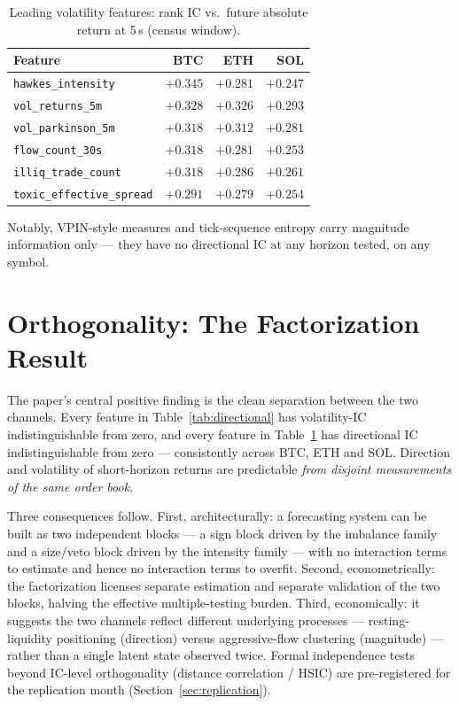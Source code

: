\documentclass[11pt,a4paper]{article}
\theoremstyle{definition}
\theoremstyle{plain}
\newcommand{\toprule}{\hline\hline}
\newcommand{\midrule}{\hline}
\newcommand{\bottomrule}{\hline\hline}
\newcommand{\feat}[1]{\texttt{#1}}
\begin{document}
\begin{table}[htbp]
\centering
\small
\caption{Leading volatility features: rank IC vs.\ future absolute
return at 5\,s (census window).}
\label{tab:volatility}
\begin{tabular}{lrrr}
\toprule
Feature & BTC & ETH & SOL \\
\midrule
\feat{hawkes\_intensity}       & $+0.345$ & $+0.281$ & $+0.247$ \\
\feat{vol\_returns\_5m}        & $+0.328$ & $+0.326$ & $+0.293$ \\
\feat{vol\_parkinson\_5m}      & $+0.318$ & $+0.312$ & $+0.281$ \\
\feat{flow\_count\_30s}        & $+0.318$ & $+0.281$ & $+0.253$ \\
\feat{illiq\_trade\_count}     & $+0.318$ & $+0.286$ & $+0.261$ \\
\feat{toxic\_effective\_spread}& $+0.291$ & $+0.279$ & $+0.254$ \\
\bottomrule
\end{tabular}
\end{table}

Notably, VPIN-style measures and tick-sequence entropy carry
magnitude information only --- they have no directional IC at any
horizon tested, on any symbol.

\section{Orthogonality: The Factorization Result}
\label{sec:orthogonality}

The paper's central positive finding is the clean separation between
the two channels. Every feature in Table~\ref{tab:directional} has
volatility-IC indistinguishable from zero, and every feature in
Table~\ref{tab:volatility} has directional IC indistinguishable from
zero --- consistently across BTC, ETH and SOL. Direction and
volatility of short-horizon returns are predictable \emph{from
disjoint measurements of the same order book}.

Three consequences follow. First, architecturally: a forecasting
system can be built as two independent blocks --- a sign block driven
by the imbalance family and a size/veto block driven by the intensity
family --- with no interaction terms to estimate and hence no
interaction terms to overfit. Second, econometrically: the
factorization licenses separate estimation and separate validation of
the two blocks, halving the effective multiple-testing burden. Third,
economically: it suggests the two channels reflect different
underlying processes --- resting-liquidity positioning (direction)
versus aggressive-flow clustering (magnitude) --- rather than a single
latent state observed twice. Formal independence tests beyond
IC-level orthogonality (distance correlation / HSIC) are
pre-registered for the replication month
(Section~\ref{sec:replication}).
\end{document}
